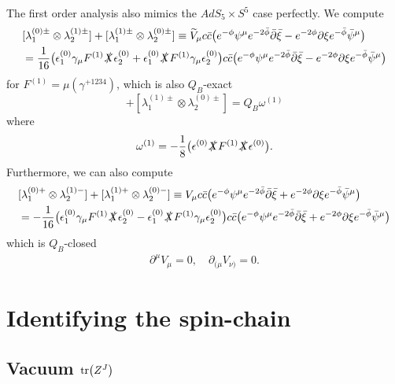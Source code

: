 \documentclass[12pt]{article}
\def\be{\begin{equation}}
\def\ee{\end{equation}}
\def\ie{\begin{equation}\begin{aligned}}
\def\fe{\end{aligned}\end{equation}}
\numberwithin{equation}{section}
\newcommand{\WT}[1]{\widetilde{#1}}
\newcommand{\B}[1]{\bar{#1}}
\begin{document}
The first order analysis also mimics the $AdS_5\times S^5$ case perfectly. We compute
\ie
    &[\lambda_1^{(0)\pm}\otimes\lambda_2^{(1)\pm}]+[\lambda_1^{(1)\pm}\otimes\lambda_2^{(0)\pm}]\equiv\WT{V}_{\mu}c\B{c}\big(e^{-\phi}\psi^{\mu}e^{-2\B{\phi}}\B{\partial}\B{\xi}-e^{-2\phi}\partial\xi e^{-\B{\phi}}\B{\psi}^{\mu}\big)\\
    &=\frac{1}{16}\big(\epsilon_1^{(0)}\gamma_{\mu}F^{(1)}\slashed{X}\epsilon_2^{(0)}+\epsilon_1^{(0)}\slashed{X}F^{(1)}\gamma_{\mu}\epsilon_2^{(0)}\big)c\B{c}\big(e^{-\phi}\psi^{\mu}e^{-2\B{\phi}}\B{\partial}\B{\xi}-e^{-2\phi}\partial\xi e^{-\B{\phi}}\B{\psi}^{\mu}\big)
\fe
for $F^{(1)}=\mu\left(\gamma^{+1234}\right)$, which is also $Q_B$-exact
\be
    [\lambda_1^{(0)\pm}\otimes\lambda_2^{(1)\pm}]+[\lambda_1^{(1)\pm}\otimes\lambda_2^{(0)\pm}]=Q_B\omega^{(1)}
\ee
where
\be
    \omega^{(1)}=-\frac{1}{8}\big(\epsilon^{(0)}\slashed{X}F^{(1)}\slashed{X}\epsilon^{(0)}\big).
\ee
Furthermore, we can also compute
\ie \label{P1st}
    &[\lambda_1^{(0)+}\otimes\lambda_2^{(1)-}]+[\lambda_1^{(1)+}\otimes\lambda_2^{(0)-}]\equiv V_{\mu}c\B{c}\big(e^{-\phi}\psi^{\mu}e^{-2\B{\phi}}\B{\partial}\B{\xi}+e^{-2\phi}\partial\xi e^{-\B{\phi}}\B{\psi}^{\mu}\big)\\
    &=-\frac{1}{16}\big(\epsilon_1^{(0)}\gamma_{\mu}F^{(1)}\slashed{X}\epsilon_2^{(0)}-\epsilon_1^{(0)}\slashed{X}F^{(1)}\gamma_{\mu}\epsilon_2^{(0)}\big)c\B{c}\big(e^{-\phi}\psi^{\mu}e^{-2\B{\phi}}\B{\partial}\B{\xi}+e^{-2\phi}\partial\xi e^{-\B{\phi}}\B{\psi}^{\mu}\big)
\fe
which is $Q_B$-closed
\ie
\partial^{\mu}{V}_{\mu}=0,\quad \partial_{(\mu}{V}_{\nu)}=0.
\fe


\section{Identifying the spin-chain}
\subsection{Vacuum $\tr(Z^J)$}
\end{document}
